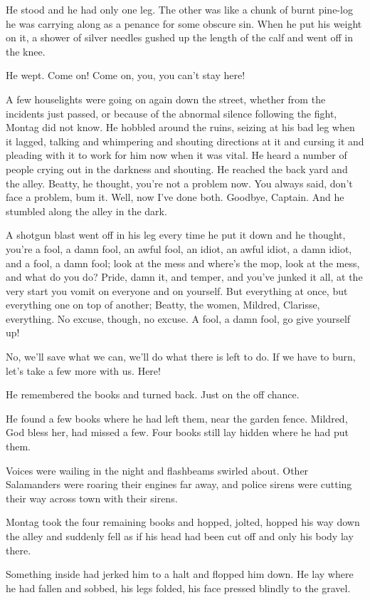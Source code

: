 \documentclass[11pt,openany]{book}
\begin{document}
He stood and he had only one leg. The other was like a chunk of burnt pine-log he was carrying along as a penance for some obscure sin. When he put his weight on it, a shower of silver needles gushed up the length of the calf and went off in the knee.

He wept. Come on! Come on, you, you can't stay here!

A few houselights were going on again down the street, whether from the incidents just passed, or because of the abnormal silence following the fight, Montag did not know. He hobbled around the ruins, seizing at his bad leg when it lagged, talking and whimpering and shouting directions at it and cursing it and pleading with it to work for him now when it was vital. He heard a number of people crying out in the darkness and shouting. He reached the back yard and the alley. Beatty, he thought, you're not a problem now. You always said, don't face a problem, bum it. Well, now I've done both. Goodbye, Captain. And he stumbled along the alley in the dark.

A shotgun blast went off in his leg every time he put it down and he thought, you're a fool, a damn fool, an awful fool, an idiot, an awful idiot, a damn idiot, and a fool, a damn fool; look at the mess and where's the mop, look at the mess, and what do you do? Pride, damn it, and temper, and you've junked it all, at the very start you vomit on everyone and on yourself. But everything at once, but everything one on top of another; Beatty, the women, Mildred, Clarisse, everything. No excuse, though, no excuse. A fool, a damn fool, go give yourself up!

No, we'll save what we can, we'll do what there is left to do. If we have to burn, let's take a few more with us. Here!

He remembered the books and turned back. Just on the off chance.

He found a few books where he had left them, near the garden fence. Mildred, God bless her, had missed a few. Four books still lay hidden where he had put them.

Voices were wailing in the night and flashbeams swirled about. Other Salamanders were roaring their engines far away, and police sirens were cutting their way across town with their sirens.

Montag took the four remaining books and hopped, jolted, hopped his way down the alley and suddenly fell as if his head had been cut off and only his body lay there.

Something inside had jerked him to a halt and flopped him down. He lay where he had fallen and sobbed, his legs folded, his face pressed blindly to the gravel.
\end{document}
